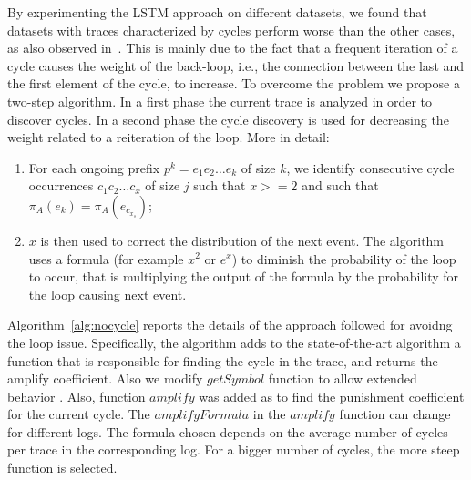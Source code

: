 
By experimenting the LSTM approach on different datasets, we found that datasets with traces characterized by cycles perform worse than the other cases, as also observed in~\cite{quteprints96732}. This is mainly due to the fact that a frequent iteration of a cycle causes the weight of the back-loop, i.e.,  the connection between the last and the first element of the cycle, to increase. To overcome the problem we propose a two-step algorithm. In a first phase the current trace is analyzed in order to discover cycles. In a second phase the cycle discovery is used for decreasing the weight related to a reiteration of the loop. 
More in detail:
\begin{enumerate}
\item For each ongoing prefix $p^k=e_1e_2 \ldots e_k$ of size $k$, we identify consecutive cycle occurrences $c_1c_2 \ldots c_x$ of size $j$ such that $x>=2$ and such that $\pi_A(e_k)=\pi_A(e_{c_{x_s}})$;  
\item $x$ is then used to correct the distribution of the next event. The algorithm uses a formula (for example $x^{2}$ or $e^{x}$) to diminish the probability of the loop to occur, that is multiplying the output of the formula by the probability for the loop causing next event. 
\end{enumerate}


Algorithm~\ref{alg:nocycle} reports the details of the approach followed for avoidng the loop issue. 
Specifically, the algorithm adds to the state-of-the-art algorithm a function that is responsible for finding the cycle in the trace, and returns the amplify coefficient. Also we modify $getSymbol$ function to allow extended behavior . Also, function $amplify$ was added as to find the punishment coefficient for the current cycle. The $amplifyFormula$ in the $amplify$ function can change for different logs.  %
The formula chosen depends on the average number of cycles per trace in the corresponding log. For a bigger number of cycles, the more steep function is selected.

